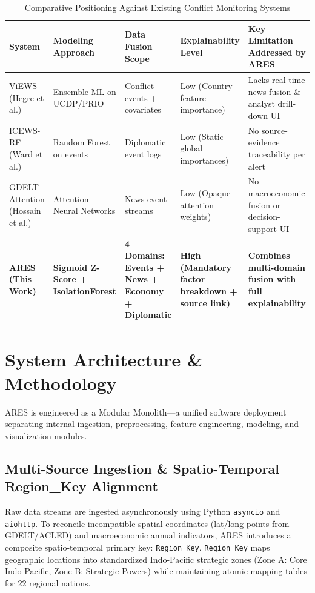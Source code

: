 \documentclass[conference]{IEEEtran}
\begin{document}
\begin{table}[htbp]
\caption{Comparative Positioning Against Existing Conflict Monitoring Systems}
\label{tab:comparative}
\centering
\begin{tabular}{p{2.5cm}p{3.2cm}p{3.2cm}p{2.8cm}p{4.2cm}}
\toprule
\textbf{System} & \textbf{Modeling Approach} & \textbf{Data Fusion Scope} & \textbf{Explainability Level} & \textbf{Key Limitation Addressed by ARES} \\
\midrule
ViEWS (Hegre et al.) & Ensemble ML on UCDP/PRIO & Conflict events + covariates & Low (Country feature importance) & Lacks real-time news fusion \& analyst drill-down UI \\
ICEWS-RF (Ward et al.) & Random Forest on events & Diplomatic event logs & Low (Static global importances) & No source-evidence traceability per alert \\
GDELT-Attention (Hossain et al.) & Attention Neural Networks & News event streams & Low (Opaque attention weights) & No macroeconomic fusion or decision-support UI \\
\textbf{ARES (This Work)} & \textbf{Sigmoid Z-Score + IsolationForest} & \textbf{4 Domains: Events + News + Economy + Diplomatic} & \textbf{High (Mandatory factor breakdown + source link)} & \textbf{Combines multi-domain fusion with full explainability} \\
\bottomrule
\end{tabular}
\end{table}

\section{System Architecture \& Methodology}
ARES is engineered as a Modular Monolith—a unified software deployment separating internal ingestion, preprocessing, feature engineering, modeling, and visualization modules.

\subsection{Multi-Source Ingestion \& Spatio-Temporal Region\_Key Alignment}
Raw data streams are ingested asynchronously using Python \texttt{asyncio} and \texttt{aiohttp}. To reconcile incompatible spatial coordinates (lat/long points from GDELT/ACLED) and macroeconomic annual indicators, ARES introduces a composite spatio-temporal primary key: \texttt{Region\_Key}.
\texttt{Region\_Key} maps geographic locations into standardized Indo-Pacific strategic zones (Zone A: Core Indo-Pacific, Zone B: Strategic Powers) while maintaining atomic mapping tables for 22 regional nations.
\end{document}
